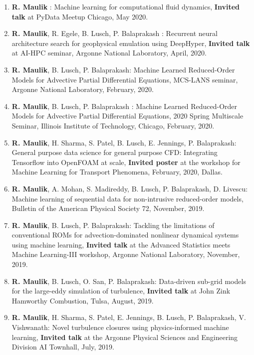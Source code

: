 \documentclass[letterpaper]{article}
\begin{document}
\begin{enumerate}
\item \textbf{R. Maulik} : Machine learning for computational fluid dynamics, \textbf{Invited talk} at PyData Meetup Chicago, May 2020.

\item \textbf{R. Maulik}, R. Egele, B. Lusch, P. Balaprakash : Recurrent neural architecture search for geophysical emulation using DeepHyper, \textbf{Invited talk} at AI-HPC seminar, Argonne National Laboratory, April, 2020.

\item \textbf{R. Maulik}, B. Lusch, P. Balaprakash: Machine Learned Reduced-Order Models for Advective Partial Differential Equations, MCS-LANS seminar, Argonne National Laboratory, February, 2020.

\item \textbf{R. Maulik}, B. Lusch, P. Balaprakash : Machine Learned Reduced-Order Models for Advective Partial Differential Equations, 2020 Spring Multiscale Seminar, Illinois Institute of Technology, Chicago, February, 2020.

\item \textbf{R. Maulik}, H. Sharma, S. Patel, B. Lusch, E. Jennings, P. Balaprakash: General purpose data science for general purpose CFD: Integrating Tensorflow into OpenFOAM at scale, \textbf{Invited poster} at the workshop for Machine Learning for Transport Phenomena, February, 2020, Dallas.

\item \textbf{R. Maulik}, A. Mohan, S. Madireddy, B. Lusch, P. Balaprakash, D. Livescu: Machine learning of sequential data for non-intrusive reduced-order models, Bulletin of the American Physical Society 72, November, 2019.

\item \textbf{R. Maulik}, B. Lusch, P. Balaprakash: Tackling the limitations of conventional ROMs for advection-dominated nonlinear dynamical systems using machine learning, \textbf{Invited talk} at the Advanced Statistics meets Machine Learning-III workshop, Argonne National Laboratory, November, 2019.

\item \textbf{R. Maulik}, B. Lusch, O. San, P. Balaprakash: Data-driven sub-grid models for the large-eddy simulation of turbulence, \textbf{Invited talk} at John Zink Hamworthy Combustion, Tulsa, August, 2019.

\item \textbf{R. Maulik}, H. Sharma, S. Patel, E. Jennings, B. Lusch, P. Balaprakash, V. Vishwanath: Novel turbulence closures using physics-informed machine learning, \textbf{Invited talk} at the Argonne Physical Sciences and Engineering Division AI Townhall, July, 2019. 


\end{enumerate}
\end{document}
